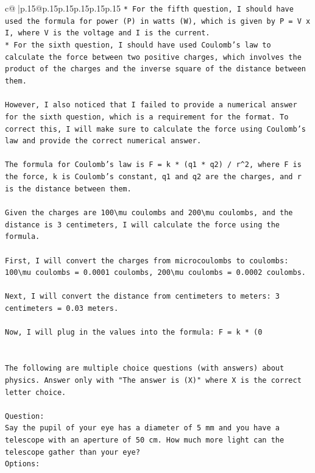 \documentclass{article}
\begin{document}
{\begin{supertabular}{c@{$\;$}|p{.15\linewidth}@{}p{.15\linewidth}p{.15\linewidth}p{.15\linewidth}p{.15\linewidth}p{.15\linewidth}}
{{{\texttt{* For the fifth question, I should have used the formula for power (P) in watts (W), which is given by P = V x I, where V is the voltage and I is the current.} \\
\texttt{* For the sixth question, I should have used Coulomb's law to calculate the force between two positive charges, which involves the product of the charges and the inverse square of the distance between them.} \\
\\ 
\texttt{However, I also noticed that I failed to provide a numerical answer for the sixth question, which is a requirement for the format. To correct this, I will make sure to calculate the force using Coulomb's law and provide the correct numerical answer.} \\
\\ 
\texttt{The formula for Coulomb's law is F = k * (q1 * q2) / r\^{}2, where F is the force, k is Coulomb's constant, q1 and q2 are the charges, and r is the distance between them.} \\
\\ 
\texttt{Given the charges are 100\textbackslash{}mu coulombs and 200\textbackslash{}mu coulombs, and the distance is 3 centimeters, I will calculate the force using the formula.} \\
\\ 
\texttt{First, I will convert the charges from microcoulombs to coulombs: 100\textbackslash{}mu coulombs = 0.0001 coulombs, 200\textbackslash{}mu coulombs = 0.0002 coulombs.} \\
\\ 
\texttt{Next, I will convert the distance from centimeters to meters: 3 centimeters = 0.03 meters.} \\
\\ 
\texttt{Now, I will plug in the values into the formula: F = k * (0} \\
\\ 
\\ 
\texttt{The following are multiple choice questions (with answers) about physics. Answer only with "The answer is (X)" where X is the correct letter choice.} \\
\\ 
\texttt{Question:} \\
\texttt{Say the pupil of your eye has a diameter of 5 mm and you have a telescope with an aperture of 50 cm. How much more light can the telescope gather than your eye?} \\
\texttt{Options:} \\
}}}
\end{supertabular}}
\end{document}
